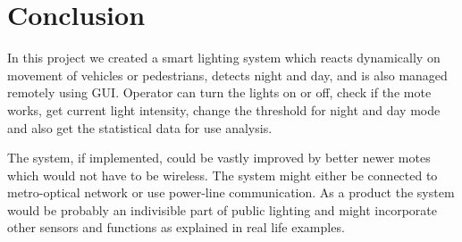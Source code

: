 \documentclass[UKenglish,10pt,a4paper]{report}
\let\openright=\clearpage
\begin{document}
\chapter{Conclusion}
In this project we created a smart lighting system which reacts dynamically on movement of vehicles or pedestrians, detects night and day, and is also managed remotely using GUI. Operator can turn the lights on or off, check if the mote works, get current light intensity, change the threshold for night and day mode and also get the statistical data for use analysis.  

The system, if implemented, could be vastly improved by better newer motes which would not have to be wireless. The system might either be connected to metro-optical network or use power-line communication. As a product the system would be probably an indivisible part of public lighting and might incorporate other sensors and functions as explained in real life examples.

\renewcommand{\acronymname}{List of acronyms}
\printglossaries



% 
\printbibliography
\openright
\end{document}

